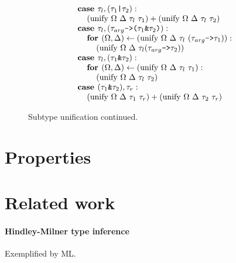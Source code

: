 \documentclass[acmsmall]{acmart}
\begin{document}
\begin{figure*}[h]
\[\begin{array}[t]{@{} l}
    \\

    \I \B{case } \tau_l, (\code{$\tau_1$|$\tau_2$}) : 
    \\
    \I\I (\F{unify } \Omega\ \Delta\ \tau_l\ \tau_1) + (\F{unify } \Omega\ \Delta\ \tau_l\ \tau_2) 

    \\

    \I \B{case } \tau_l, (\code{$\tau_{arg}$->($\tau_1$\&$\tau_2$)}) : 
    \\
    \I\I \B{for } (\Omega, \Delta) \leftarrow (\F{unify } \Omega\ \Delta\ \tau_l\ (\code{$\tau_{arg}$->$\tau_1$})):
    \\
    \I\I\I (\F{unify } \Omega\ \Delta\ \tau_l (\code{$\tau_{arg}$->$\tau_2$}))

    \\

    \I \B{case } \tau_l, (\code{$\tau_1$\&$\tau_2$}) : 
    \\
    \I\I \B{for } (\Omega, \Delta) \leftarrow (\F{unify } \Omega\ \Delta\ \tau_l\ \tau_1):
    \\
    \I\I\I (\F{unify } \Omega\ \Delta\ \tau_l\ \tau_2) 

    \\

    \I \B{case } (\code{$\tau_1$\&$\tau_2$}), \tau_r : 
    \\
    \I\I (\F{unify } \Omega\ \Delta\ \tau_1\ \tau_r) + (\F{unify } \Omega\ \Delta\ \tau_2\ \tau_r) 
\end{array}
\]

\caption{Subtype unification continued.}
\end{figure*}



\section{Properties}

\section{Related work}

\paragraph{Hindley-Milner type inference}
Exemplified by ML.
\end{document}
